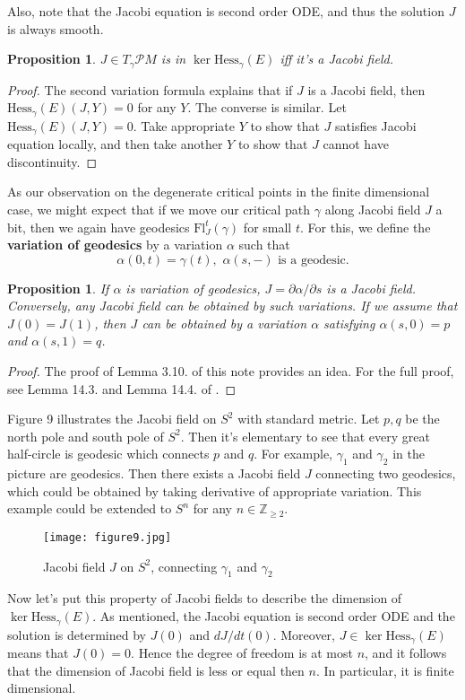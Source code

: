 \documentclass{article}
\newtheorem{proposition}[theorem]{Proposition}
\newcommand{\Z}{\mathbb{Z}}
\newcommand{\pp}{\partial}
\newcommand{\PM}{\mathcal{P}M}
\newcommand{\g}{\gamma}
\newcommand{\Hess}{\mathrm{Hess}}
\newcommand{\Fl}{\mathrm{Fl}}
\begin{document}
Also, note that the Jacobi equation is second order ODE, and thus the solution $J$ is always smooth.
	\begin{proposition}\rm
	$J\in T_\g\PM$ is in $\ker\Hess_\g(E)$ iff it's a Jacobi field.
	\end{proposition}
		\begin{proof}
		The second variation formula explains that if $J$ is a Jacobi field, then $\Hess_\g(E)(J,Y)=0$ for any $Y$.
		The converse is similar.
		Let $\Hess_\g(E)(J,Y)=0$.
		Take appropriate $Y$ to show that $J$ satisfies Jacobi equation locally, and then take another $Y$ to show that $J$ cannot have discontinuity.
		\end{proof}
As our observation on the degenerate critical points in the finite dimensional case, we might expect that if we move our critical path $\g$ along Jacobi field $J$ a bit, then we again have geodesics $\Fl^t_{J}(\g)$ for small $t$.
For this, we define the \textbf{variation of geodesics} by a variation $\alpha$ such that
	$$\alpha(0,t)=\g(t),\,\,\alpha(s,-)\text{ is a geodesic.}$$
	\begin{proposition}\rm
	If $\alpha$ is variation of geodesics, $J=\pp\alpha/\pp s$ is a Jacobi field.
	Conversely, any Jacobi field can be obtained by such variations.
	If we assume that $J(0)=J(1)$, then $J$ can be obtained by a variation $\alpha$ satisfying $\alpha(s,0)=p$ and $\alpha(s,1)=q$.
	\end{proposition}
		\begin{proof}
		The proof of Lemma 3.10. of this note provides an idea.
		For the full proof, see Lemma 14.3. and Lemma 14.4. of \cite{m1}.
		\end{proof}
Figure 9 illustrates the Jacobi field on $S^2$ with standard metric.
Let $p,q$ be the north pole and south pole of $S^2$.
Then it's elementary to see that every great half-circle is geodesic which connects $p$ and $q$.
For example, $\g_1$ and $\g_2$ in the picture are geodesics.
Then there exists a Jacobi field $J$ connecting two geodesics, which could be obtained by taking derivative of appropriate variation.
This example could be extended to $S^n$ for any $n\in\Z_{\geq2}$.

\begin{figure}[h]
		\centering
		\texttt{[image: figure9.jpg]}
		\caption{Jacobi field $J$ on $S^2$, connecting $\g_1$ and $\g_2$}
\end{figure}

Now let's put this property of Jacobi fields to describe the dimension of $\ker\Hess_\g(E)$.
As mentioned, the Jacobi equation is second order ODE and the solution is determined by $J(0)$ and $dJ/dt(0)$.
Moreover, $J\in\ker\Hess_\g(E)$ means that $J(0)=0$.
Hence the degree of freedom is at most $n$, and it follows that the dimension of Jacobi field is less or equal then $n$.
In particular, it is finite dimensional.
\end{document}
